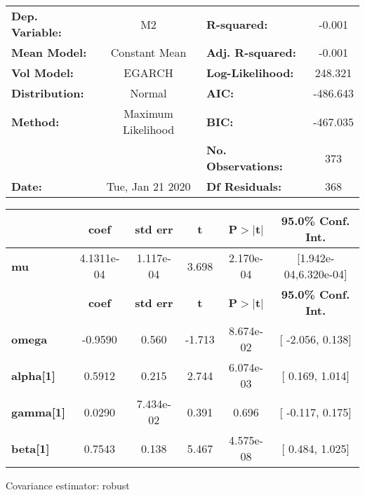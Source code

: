 \begin{center}
\begin{tabular}{lclc}
\toprule
\textbf{Dep. Variable:} &         M2         & \textbf{  R-squared:         } &    -0.001   \\
\textbf{Mean Model:}    &   Constant Mean    & \textbf{  Adj. R-squared:    } &    -0.001   \\
\textbf{Vol Model:}     &       EGARCH       & \textbf{  Log-Likelihood:    } &    248.321  \\
\textbf{Distribution:}  &       Normal       & \textbf{  AIC:               } &   -486.643  \\
\textbf{Method:}        & Maximum Likelihood & \textbf{  BIC:               } &   -467.035  \\
\textbf{}               &                    & \textbf{  No. Observations:  } &    373      \\
\textbf{Date:}          &  Tue, Jan 21 2020  & \textbf{  Df Residuals:      } &    368      \\
\bottomrule
\end{tabular}
\begin{tabular}{lccccc}
            & \textbf{coef} & \textbf{std err} & \textbf{t} & \textbf{P$>$$|$t$|$} & \textbf{95.0\% Conf. Int.}  \\
\midrule
\textbf{mu} &   4.1311e-04  &    1.117e-04     &     3.698  &      2.170e-04       &   [1.942e-04,6.320e-04]     \\
                  & \textbf{coef} & \textbf{std err} & \textbf{t} & \textbf{P$>$$|$t$|$} & \textbf{95.0\% Conf. Int.}  \\
\midrule
\textbf{omega}    &      -0.9590  &        0.560     &    -1.713  &      8.674e-02       &     [ -2.056,  0.138]       \\
\textbf{alpha[1]} &       0.5912  &        0.215     &     2.744  &      6.074e-03       &     [  0.169,  1.014]       \\
\textbf{gamma[1]} &       0.0290  &    7.434e-02     &     0.391  &          0.696       &     [ -0.117,  0.175]       \\
\textbf{beta[1]}  &       0.7543  &        0.138     &     5.467  &      4.575e-08       &     [  0.484,  1.025]       \\
\bottomrule
\end{tabular}
\end{center}

Covariance estimator: robust